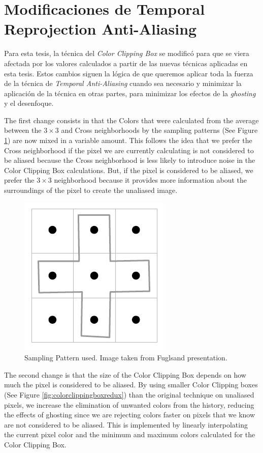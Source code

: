 \documentclass[pregrado]{tesis-usb} %
\begin{document}
\section[Modificaciones de Temporal Reprojection Anti-Aliasing ]{Modificaciones de Temporal Reprojection Anti-Aliasing }
Para esta tesis, la técnica del \textit{Color Clipping Box} se modificó para que se viera afectada por los valores calculados a partir de las nuevas técnicas aplicadas en esta tesis. Estos cambios siguen la lógica de que queremos aplicar toda la fuerza de la técnica de \textit{Temporal Anti-Aliasing} cuando sea necesario y minimizar la aplicación de la técnica en otras partes, para minimizar los efectos de la \textit{ghosting} y el desenfoque.

The first change consists in that the Colors that were calculated from the average between the $3\times 3$ and Cross neighborhoods by the sampling patterns (See Figure \ref{fig:samplingpattern_2}) are now mixed in a variable amount. This follows the idea that we prefer the Cross neighborhood if the pixel we are currently calculating is not considered to be aliased because the Cross neighborhood is less likely to introduce noise in the Color Clipping Box calculations. But, if the pixel is considered to be aliased, we prefer the $3\times 3$ neighborhood because it provides more information about the surroundings of the pixel to create the unaliased image.  

\begin{figure}[!hbt]
	\centering
	\includegraphics[scale=0.3]{images/sampling_pattern.png}
	\caption{Sampling Pattern used. Image taken from Fuglsand presentation. \protect\cite{Fuglsand2016}}\label{fig:samplingpattern_2}
\end{figure}

The second change is that the size of the Color Clipping Box depends on how much the pixel is considered to be aliased. By using smaller Color Clipping boxes (See Figure \ref{fig:colorclippingboxredux}) than the original technique on unaliased pixels, we increase the elimination of unwanted colors from the history, reducing the effects of ghosting since we are rejecting colors faster on pixels that we know are not considered to be aliased. This is implemented by linearly interpolating the current pixel color and the minimum and maximum colors calculated for the Color Clipping Box.
\end{document}
